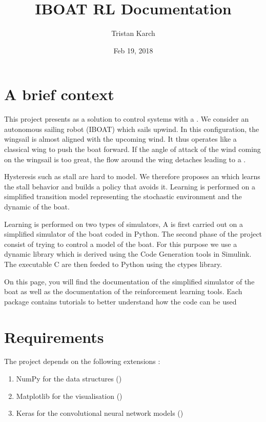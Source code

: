 \documentclass[letterpaper,10pt,english]{sphinxmanual}
\title{IBOAT RL Documentation}
\date{Feb 19, 2018}
\author{Tristan Karch}
\begin{document}
\maketitle
\sphinxtableofcontents
{}\label{\detokenize{index::doc}}



\chapter{A brief context}
\label{\detokenize{index:a-brief-context}}\label{\detokenize{index:welcome-to-iboat-rl-s-documentation}}
This project presents  as a solution to control systems with a . We consider an
autonomous sailing robot (IBOAT) which sails upwind. In this configuration, the wingsail is almost aligned with the upcoming wind. It thus operates like
a classical wing to push the boat forward. If the angle of attack of the wind coming on the wingsail is too great, the flow around the wing detaches leading to
a .

Hysteresis such as stall are hard to model. We therefore proposes an  which learns the stall behavior and
builds a policy that avoids it. Learning is performed on a simplified transition model representing the stochastic environment and the dynamic of the boat.

Learning is performed on two types of simulators, A  is first carried out on a simplified simulator of the boat coded in Python. The second phase of the project consist of trying to control a   model of the boat. For this purpose we use a dynamic library which is derived using the Code Generation tools in Simulink. The executable C are then feeded to Python using the \sphinxquotedblleft{}ctypes\sphinxquotedblright{} library.

On this page, you will find the documentation of the simplified simulator of the boat as well as the documentation of the reinforcement learning tools. Each package contains tutorials to better understand how the code can be used


\chapter{Requirements}
\label{\detokenize{index:requirements}}
The project depends on the following extensions :
\begin{enumerate}
\item {} 
NumPy for the data structures ()

\item {} 
Matplotlib for the visualisation ()

\item {} 
Keras for the convolutional neural network models ()

\end{enumerate}
\end{document}
